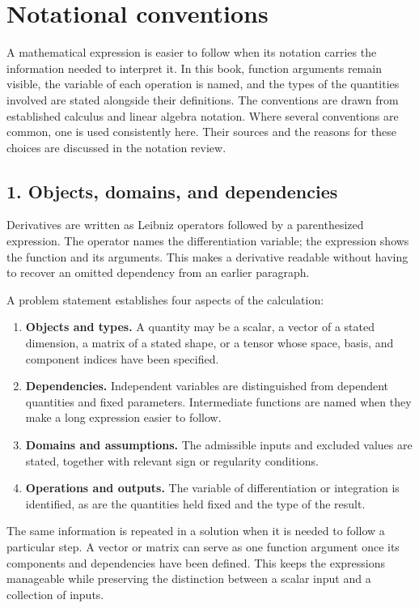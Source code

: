 \documentclass[11pt,oneside,openany]{book}
\begin{document}
\chapter{Notational conventions}

A mathematical expression is easier to follow when its notation carries the
information needed to interpret it. In this book, function arguments remain
visible, the variable of each operation is named, and the types of the quantities
involved are stated alongside their definitions. The conventions are drawn from
established calculus and linear algebra notation. Where several conventions are
common, one is used consistently here. Their sources and the reasons for these
choices are discussed in the notation review.

\section{1. Objects, domains, and dependencies}

Derivatives are written as Leibniz operators followed by a parenthesized
expression. The operator names the differentiation variable; the expression
shows the function and its arguments. This makes a derivative readable without
having to recover an omitted dependency from an earlier paragraph.

A problem statement establishes four aspects of the calculation:

\begin{enumerate}
\item \textbf{Objects and types.} A quantity may be a scalar, a vector of a stated dimension, a matrix of a stated shape, or a tensor whose space, basis, and component indices have been specified.
\item \textbf{Dependencies.} Independent variables are distinguished from dependent quantities and fixed parameters. Intermediate functions are named when they make a long expression easier to follow.
\item \textbf{Domains and assumptions.} The admissible inputs and excluded values are stated, together with relevant sign or regularity conditions.
\item \textbf{Operations and outputs.} The variable of differentiation or integration is identified, as are the quantities held fixed and the type of the result.

\end{enumerate}
The same information is repeated in a solution when it is needed to follow a
particular step. A vector or matrix can serve as one function argument once its
components and dependencies have been defined. This keeps the expressions
manageable while preserving the distinction between a scalar input and a
collection of inputs.
\clearpage
\end{document}
